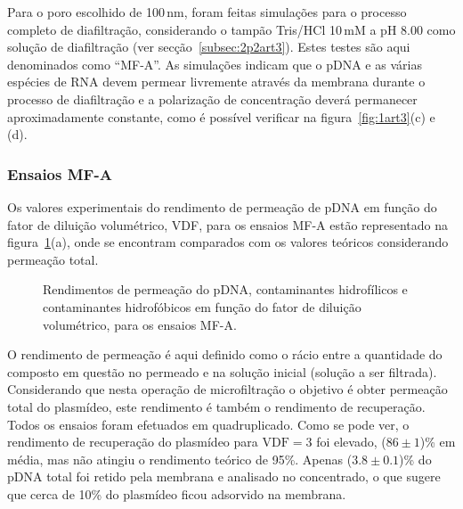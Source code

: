 Para o poro escolhido de 100\,nm, foram feitas simulações para o processo completo de diafiltração, considerando o tampão Tris/HCl 10\,mM a pH 8.00 como solução de diafiltração (ver secção~\ref{subsec:2p2art3}).
%
Estes testes são aqui denominados como ``MF-A''. As simulações indicam que o pDNA e as várias espécies de RNA devem permear livremente através da membrana durante o processo de diafiltração e a polarização de concentração deverá permanecer aproximadamente constante, como é possível verificar na figura~\ref{fig:1art3}(c) e (d). 

\subsubsection{Ensaios MF-A}
\label{subsubsec:3p1p2art3}
%
%
%
%
Os valores experimentais do rendimento de permeação de pDNA em função do fator de diluição volumétrico, VDF, para os ensaios MF-A estão representado na figura~\ref{fig:2aart3}(a), onde se encontram comparados com os valores teóricos considerando permeação total.
% 
\begin{figure}
	\centering
	\setlength\figureheight{6cm} 
	\setlength\figurewidth{6cm}
	
	\caption[Rendimentos de permeação de pDNA e contaminantes (MF-A)]{Rendimentos de permeação do pDNA, contaminantes hidrofílicos e contaminantes hidrofóbicos em função do fator de diluição volumétrico, para os ensaios MF-A.}
	\label{fig:2aart3}
\end{figure}
O rendimento de permeação é aqui definido como o rácio entre a quantidade do composto em questão no permeado e na solução inicial (solução a ser filtrada).
%
Considerando que nesta operação de microfiltração o objetivo é obter permeação total do plasmídeo, este rendimento é também o rendimento de recuperação.
%
Todos os ensaios foram efetuados em quadruplicado. Como se pode ver, o rendimento de recuperação do plasmídeo para $\mathrm{VDF}=3$ foi elevado, ($86\pm 1$)\% em média, mas não atingiu o rendimento teórico de 95\%. Apenas ($3.8\pm 0.1$)\% do pDNA total foi retido pela membrana e analisado no concentrado, o que sugere que cerca de 10\% do plasmídeo ficou adsorvido na membrana.
%
